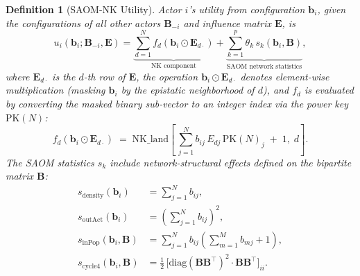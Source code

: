 \documentclass[12pt]{article}
\newtheorem{definition}{Definition}
\newcommand{\bb}{\mathbf{b}}
\newcommand{\bB}{\mathbf{B}}
\newcommand{\bE}{\mathbf{E}}
\begin{document}
\begin{definition}[SAOM-NK Utility]
\label{def:saomnk_utility}
Actor $i$'s utility from configuration $\bb_i$, given the configurations of all
other actors $\bB_{-i}$ and influence matrix $\bE$, is
\begin{equation}
\label{eq:saomnk_utility}
  u_i(\bb_i; \bB_{-i}, \bE)
  = \underbrace{\sum_{d=1}^{N}
    f_d\!\left(\bb_i \odot \bE_{d\cdot}\right)}_{\text{NK component}}
  + \underbrace{\sum_{k=1}^{p} \theta_k \, s_k(\bb_i, \bB)}_{\text{SAOM network statistics}},
\end{equation}
where $\bE_{d\cdot}$ is the $d$-th row of $\bE$, the operation
$\bb_i \odot \bE_{d\cdot}$ denotes element-wise multiplication (masking
$\bb_i$ by the epistatic neighborhood of $d$), and $f_d$ is evaluated by
converting the masked binary sub-vector to an integer index via the power key
$\mathrm{PK}(N)$:
\begin{equation}
\label{eq:powerkey_index}
  f_d\!\left(\bb_i \odot \bE_{d\cdot}\right)
  \;=\; \mathrm{NK\_land}\!\left[\,
    \sum_{j=1}^{N} b_{ij}\, E_{dj}\, \mathrm{PK}(N)_j \;+\; 1,\; d\right].
\end{equation}
The SAOM statistics $s_k$ include network-structural effects defined on the
bipartite matrix $\bB$:
\begin{align}
  s_{\mathrm{density}}(\bb_i) &= \sum_{j=1}^N b_{ij}, \label{eq:density}\\
  s_{\mathrm{outAct}}(\bb_i) &= \left(\sum_{j=1}^N b_{ij}\right)^{\!2}, \label{eq:outact}\\
  s_{\mathrm{inPop}}(\bb_i, \bB) &= \sum_{j=1}^N b_{ij}\left(\sum_{m=1}^M b_{mj} + 1\right), \label{eq:inpop}\\
  s_{\mathrm{cycle4}}(\bb_i, \bB) &= \tfrac{1}{2}\,\bigl[\mathrm{diag}(\bB\bB^\top)^2 \cdot \bB\bB^\top\bigr]_{ii}. \label{eq:cycle4}
\end{align}
\end{definition}
\end{document}
